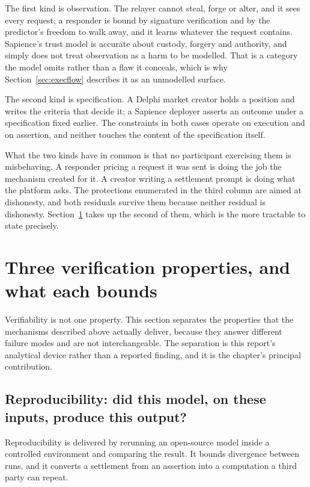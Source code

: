 The first kind is observation. The relayer cannot steal, forge or alter, and it sees every
request; a responder is bound by signature verification and by the predictor's freedom to
walk away, and it learns whatever the request contains. Sapience's trust model is accurate
about custody, forgery and authority, and simply does not treat observation as a harm to be
modelled. That is a category the model omits rather than a flaw it conceals, which is why
Section~\ref{sec:execflow} describes it as an unmodelled surface.

The second kind is specification. A Delphi market creator holds a position and writes the
criteria that decide it; a Sapience deployer asserts an outcome under a specification fixed
earlier. The constraints in both cases operate on execution and on assertion, and neither
touches the content of the specification itself.

What the two kinds have in common is that no participant exercising them is misbehaving. A
responder pricing a request it was sent is doing the job the mechanism created for it. A
creator writing a settlement prompt is doing what the platform asks. The protections
enumerated in the third column are aimed at dishonesty, and both residuals survive them
because neither residual is dishonesty. Section~\ref{sec:threelayer} takes up the second of
them, which is the more tractable to state precisely.

\section{Three verification properties, and what each bounds}
\label{sec:threelayer}

Verifiability is not one property. This section separates the properties that the mechanisms
described above actually deliver, because they answer different failure modes and are not
interchangeable. The separation is this report's analytical device rather than a reported
finding, and it is the chapter's principal contribution.

\subsection*{Reproducibility: did this model, on these inputs, produce this output?}

Reproducibility is delivered by rerunning an open-source model inside a controlled
environment and comparing the result. It bounds divergence between runs, and it converts a
settlement from an assertion into a computation a third party can repeat.

